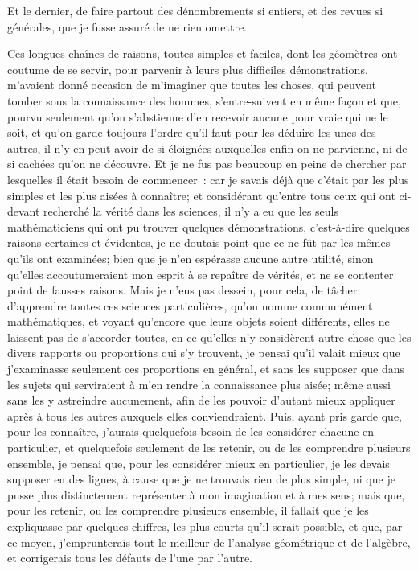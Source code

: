 \documentclass[french,twoside]{book} %
\begin{document}
Et le dernier, de faire partout des dénombrements si entiers, et des revues si générales, que je fusse assuré de ne rien omettre.\par
Ces longues chaînes de raisons, toutes simples et faciles, dont les géomètres ont coutume de se servir, pour parvenir à leurs plus difficiles démonstrations, m'avaient donné occasion de m'imaginer que toutes les choses, qui peuvent tomber sous la connaissance des hommes, s'entre-suivent en même façon et que, pourvu seulement qu'on s'abstienne d'en recevoir aucune pour vraie qui ne le soit, et qu'on garde toujours l'ordre qu'il faut pour les déduire les unes des autres, il n'y en peut avoir de si éloignées auxquelles enfin on ne parvienne, ni de si cachées qu'on ne découvre. Et je ne fus pas beaucoup en peine de chercher par lesquelles il était besoin de commencer : car je savais déjà que c'était par les plus simples et les plus aisées à connaître; et considérant qu'entre tous ceux qui ont ci-devant recherché la vérité dans les sciences, il n'y a eu que les seuls mathématiciens qui ont pu trouver quelques démonstrations, c'est-à-dire quelques raisons certaines et évidentes, je ne doutais point que ce ne fût par les mêmes qu'ils ont examinées; bien que je n'en espérasse aucune autre utilité, sinon qu'elles accoutumeraient mon esprit à se repaître de vérités, et ne se contenter point de fausses raisons. Mais je n'eus pas dessein, pour cela, de tâcher d'apprendre toutes ces sciences particulières, qu'on nomme communément mathématiques, et voyant qu'encore que leurs objets soient différents, elles ne laissent pas de s'accorder toutes, en ce qu'elles n'y considèrent autre chose que les divers rapports ou proportions qui s'y trouvent, je pensai qu'il valait mieux que j'examinasse seulement ces proportions en général, et sans les supposer que dans les sujets qui serviraient à m'en rendre la connaissance plus aisée; même aussi sans les y astreindre aucunement, afin de les pouvoir d'autant mieux appliquer après à tous les autres auxquels elles conviendraient. Puis, ayant pris garde que, pour les connaître, j'aurais quelquefois besoin de les considérer chacune en particulier, et quelquefois seulement de les retenir, ou de les comprendre plusieurs ensemble, je pensai que, pour les considérer mieux en particulier, je les devais supposer en des lignes, à cause que je ne trouvais rien de plus simple, ni que je pusse plus distinctement représenter à mon imagination et à mes sens; mais que, pour les retenir, ou les comprendre plusieurs ensemble, il fallait que je les expliquasse par quelques chiffres, les plus courts qu'il serait possible, et que, par ce moyen, j'emprunterais tout le meilleur de l'analyse géométrique et de l'algèbre, et corrigerais tous les défauts de l'une par l'autre.\par
\end{document}
